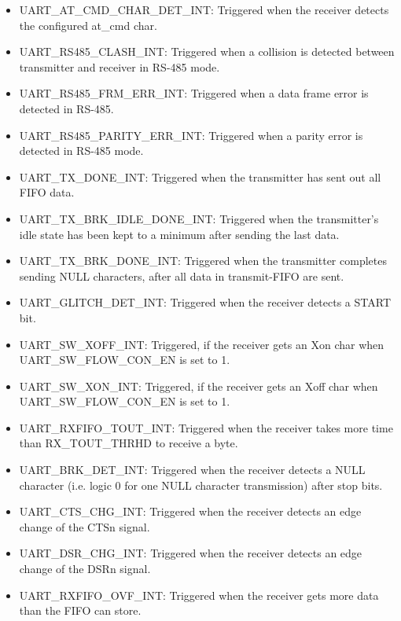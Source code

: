 \documentclass[main\_\_EN.tex]{subfiles}
\begin{document}
\begin{itemize}
\item \label{int:UARTATCMDCHARDETINT}UART\_AT\_CMD\_CHAR\_DET\_INT: Triggered when the receiver detects the configured at\_cmd char.
\item \label{int:UARTRS485CLASHINT}UART\_RS485\_CLASH\_INT: Triggered when a collision is detected between transmitter and receiver in RS-485 mode.
\item \label{int:UARTRS485FRMERRINT}UART\_RS485\_FRM\_ERR\_INT: Triggered when a data frame error is detected in RS-485.
\item \label{int:UARTRS485PARITYERRINT}UART\_RS485\_PARITY\_ERR\_INT: Triggered when a parity error is detected in RS-485 mode.
\item \label{int:UARTTXDONEINT}UART\_TX\_DONE\_INT: Triggered when the transmitter has sent out all FIFO data.
\item \label{int:UARTTXBRKIDLEDONEINT}UART\_TX\_BRK\_IDLE\_DONE\_INT: Triggered when the transmitter's idle state has been kept to a minimum after sending the last data.
\item \label{int:UARTTXBRKDONEINT}UART\_TX\_BRK\_DONE\_INT: Triggered when the transmitter completes sending NULL characters, after all data in transmit-FIFO are sent.
\item \label{int:UARTGLITCHDETINT}UART\_GLITCH\_DET\_INT: Triggered when the receiver detects a START bit.
\item \label{int:UARTSWXOFFINT}UART\_SW\_XOFF\_INT: Triggered, if the receiver gets an Xon char when UART\_SW\_FLOW\_CON\_EN is set to 1.
\item \label{int:UARTSWXONINT}UART\_SW\_XON\_INT: Triggered, if the receiver gets an Xoff char when UART\_SW\_FLOW\_CON\_EN is set to 1.
\item \label{int:UARTRXFIFOTOUTINT}UART\_RXFIFO\_TOUT\_INT: Triggered when the receiver takes more time than RX\_TOUT\_THRHD to receive a byte.
\item \label{int:UARTBRKDETINT}UART\_BRK\_DET\_INT: Triggered when the receiver detects a NULL character (i.e. logic 0 for one NULL character transmission) after stop bits.
\item \label{int:UARTCTSCHGINT}UART\_CTS\_CHG\_INT: Triggered when the receiver detects an edge change of the CTSn signal.
\item \label{int:UARTDSRCHGINT}UART\_DSR\_CHG\_INT: Triggered when the receiver detects an edge change of the DSRn signal.
\item \label{int:UARTRXFIFOOVFINT}UART\_RXFIFO\_OVF\_INT: Triggered when the receiver gets more data than the FIFO can store.

\end{itemize}
\end{document}
